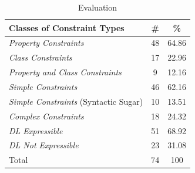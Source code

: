 \documentclass{llncs}
\begin{document}
{\begin{table}
  \vspace{0cm}
	\centering
		\begin{tabular}{l|c|c}
      \textbf{Classes of Constraint Types} & \textbf{\#} & \textbf{\%} \\
      \hline
\emph{Property Constraints} & 48 & 64.86 \\
\emph{Class Constraints} & 17 & 22.96 \\
\emph{Property and Class Constraints} & 9 & 12.16 \\
\hline
\emph{Simple Constraints} & 46 & 62.16 \\
\emph{Simple Constraints} (Syntactic Sugar) & 10 & 13.51 \\
\emph{Complex Constraints} & 18 & 24.32 \\
\hline
\emph{DL Expressible} & 51 & 68.92 \\
\emph{DL Not Expressible} & 23 & 31.08 \\
\hline
Total & 74 & 100 \\
		\end{tabular}
	\caption{Evaluation}
	\label{tab:evaluation}
\end{table}

%

}
\end{document}
